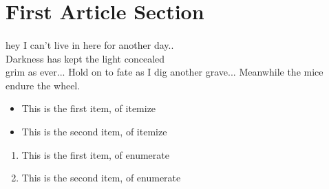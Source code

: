 \section{First Article Section}
    \paragraph{}hey I can't live in here for another day.. \\
			    Darkness has kept the light concealed \\
			    grim as ever... Hold on to fate as I dig another
			    grave...
			    Meanwhile the mice endure the wheel.
			    \cite{Gerkey2000}

    \begin{itemize}
        \item This is the first item, of itemize
        \item This is the second item, of itemize
    \end{itemize}
    
    \begin{enumerate}
        \item This is the first item, of enumerate
        \item This is the second item, of enumerate
    \end{enumerate}
    
\newpage
